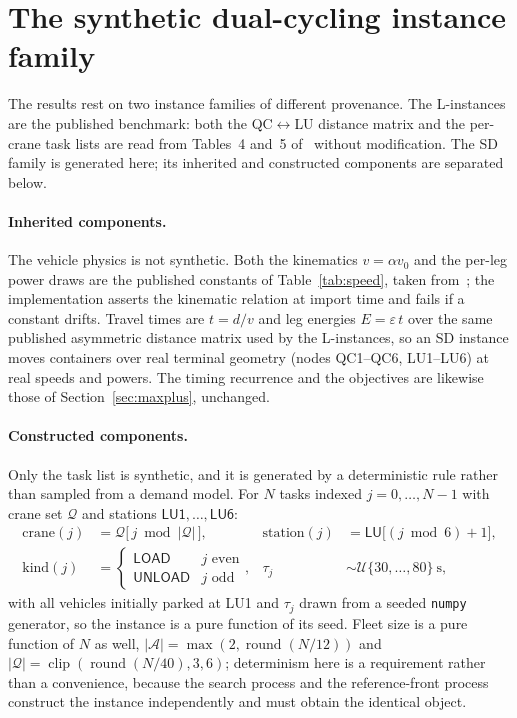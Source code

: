 \documentclass[11pt]{article}
\begin{document}
\section{The synthetic dual-cycling instance family}
\label{app:instances}
The results rest on two instance families of different provenance. The
\textsf{L}-instances are the published benchmark: both the QC$\leftrightarrow$LU distance
matrix and the per-crane task lists are read from Tables~4 and~5
of~\cite{homayouni2022book} without modification. The \textsf{SD} family is generated
here; its inherited and constructed components are separated below.

\paragraph{Inherited components.} The vehicle physics is not synthetic. Both the kinematics
$v=\alpha v_0$ and the per-leg power draws are the published constants of
Table~\ref{tab:speed}, taken from~\cite{fontes2022mpbrkga,fontes2023flowtime}; the
implementation asserts the kinematic relation at import time and fails if a constant drifts.
Travel times are $t=d/v$ and leg energies $E=\varepsilon\, t$ over the same published
asymmetric distance matrix used by the \textsf{L}-instances, so an \textsf{SD} instance moves
containers over real terminal geometry (nodes \textsf{QC1}--\textsf{QC6},
\textsf{LU1}--\textsf{LU6}) at real speeds and powers. The timing recurrence and the
objectives are likewise those of Section~\ref{sec:maxplus}, unchanged.

\paragraph{Constructed components.} Only the task list is synthetic, and it is generated
by a deterministic rule rather than sampled from a demand model. For $N$ tasks indexed
$j=0,\dots,N-1$ with crane set $\mathcal Q$ and stations $\textsf{LU1},\dots,\textsf{LU6}$:
\begin{align*}
\text{crane}(j) &= \mathcal Q\big[\,j \bmod |\mathcal Q|\,\big], &
\text{station}(j) &= \textsf{LU}\big[(j \bmod 6)+1\big],\\
\text{kind}(j) &= \begin{cases}\textsf{LOAD} & j \text{ even}\\ \textsf{UNLOAD} & j \text{ odd}\end{cases}, &
\tau_j &\sim \mathcal U\{30,\dots,80\}\ \text{s},
\end{align*}
with all vehicles initially parked at \textsf{LU1} and $\tau_j$ drawn from a seeded
\texttt{numpy} generator, so the instance is a pure function of its seed. Fleet size is a
pure function of $N$ as well, $|\mathcal A| = \max(2,\operatorname{round}(N/12))$ and
$|\mathcal Q| = \operatorname{clip}(\operatorname{round}(N/40),3,6)$; determinism here is a
requirement rather than a convenience, because the search process and the reference-front
process construct the instance independently and must obtain the identical object.
\end{document}
